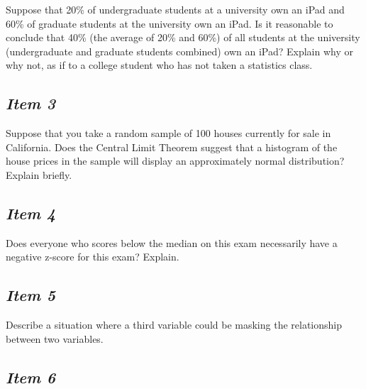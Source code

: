 Suppose that 20\% of undergraduate students at a university own an iPad and 60\% of graduate students at the university own an iPad. Is it reasonable to conclude that 40\% (the average of 20\% and 60\%) of all students at the university (undergraduate and graduate students combined) own an iPad? Explain why or why not, as if to a college student who has not taken a statistics class.








\subsection{\textbf{\textit{Item 3}}}


Suppose that you take a random sample of 100 houses currently for sale in California. Does the Central Limit Theorem suggest that a histogram of the house prices in the sample will display an approximately normal distribution? Explain briefly.





\subsection{\textbf{\textit{Item 4}}}


Does everyone who scores below the median on this exam necessarily have a negative z-score for this exam? Explain.





\subsection{\textbf{\textit{Item 5}}}


%


Describe a situation
where a third variable could be masking the relationship between two variables.





\subsection{\textbf{\textit{Item 6}}}


